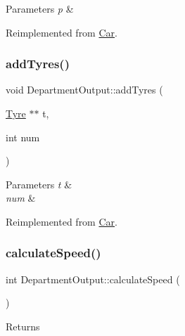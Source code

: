 \begin{DoxyParams}{Parameters}
{\em p} & \\
\hline
\end{DoxyParams}


Reimplemented from \hyperlink{classCar_a946872fcdb7625c343e5caf90fa39617}{Car}.

\mbox{\label{classDepartmentOutput_a7f231762cf94d1f18a2e7bb3290afbda}} 
\subsubsection{\texorpdfstring{add\+Tyres()}{addTyres()}}
{\footnotesize\ttfamily void Department\+Output\+::add\+Tyres (\begin{DoxyParamCaption}\item[{\hyperlink{classTyre}{Tyre} $\ast$$\ast$}]{t,  }\item[{int}]{num }\end{DoxyParamCaption})\hspace{0.3cm}{\ttfamily [virtual]}}


\begin{DoxyParams}{Parameters}
{\em t} & \\
\hline
{\em num} & \\
\hline
\end{DoxyParams}


Reimplemented from \hyperlink{classCar_a5c5f22cb9232b88a53a4ffc324824aa1}{Car}.

\mbox{\label{classDepartmentOutput_a34d5c432ee7e7e8a33a4e8099a2c751f}} 
\subsubsection{\texorpdfstring{calculate\+Speed()}{calculateSpeed()}}
{\footnotesize\ttfamily int Department\+Output\+::calculate\+Speed (\begin{DoxyParamCaption}{ }\end{DoxyParamCaption})\hspace{0.3cm}{\ttfamily [virtual]}}

\begin{DoxyReturn}{Returns}

\end{DoxyReturn}



